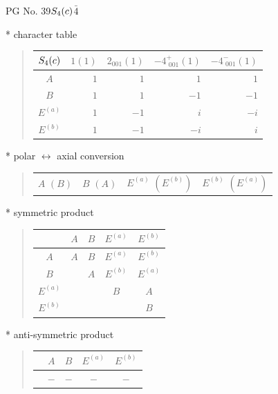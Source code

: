 \documentclass[fleqn,8pt,landscape]{jsarticle}
\begin{document}
\setcounter{MaxMatrixCols}{32}

\renewcommand{\tablename}{Table~}
\renewcommand{\figurename}{Figure~}
\begin{center}
\LARGE
PG No. 39\quad$S_{\rm 4}(c)$\quad$\bar{4}$\quad[ tetragonal ]
\end{center}

* character table
\begin{quote}
\begin{tabular}{crrrr} \hline \hline
$ S_{\rm 4}(c) $ & $ 1(1) $ & $ 2{}_{001}(1) $ & $ -4^{+}_{\,\,001}(1) $ & $ -4^{-}_{\,\,001}(1) $ \\ \hline
$ A $ & $ 1 $ & $ 1 $ & $ 1 $ & $ 1 $ \\
$ B $ & $ 1 $ & $ 1 $ & $ -1 $ & $ -1 $ \\
$ E^{(a)} $ & $ 1 $ & $ -1 $ & $ i $ & $ - i $ \\
$ E^{(b)} $ & $ 1 $ & $ -1 $ & $ - i $ & $ i $ \\
 \hline \hline
\end{tabular}
\end{quote}

* polar $\leftrightarrow$ axial conversion
\begin{quote}
\begin{tabular}{cccc}
$ A\,\,(B) $ & $ B\,\,(A) $ & $ E^{(a)}\,\,(E^{(b)}) $ & $ E^{(b)}\,\,(E^{(a)}) $
\end{tabular}
\end{quote}

* symmetric product
\begin{quote}
\begin{tabular}{c|cccc} \hline \hline
 & $ A $ & $ B $ & $ E^{(a)} $ & $ E^{(b)} $ \\ \hline
$ A $ & $ A $ & $ B $ & $ E^{(a)} $ & $ E^{(b)} $ \\
$ B $ & $  $ & $ A $ & $ E^{(b)} $ & $ E^{(a)} $ \\
$ E^{(a)} $ & $  $ & $  $ & $ B $ & $ A $ \\
$ E^{(b)} $ & $  $ & $  $ & $  $ & $ B $ \\
 \hline \hline
\end{tabular}
\end{quote}

* anti-symmetric product
\begin{quote}
\begin{tabular}{ccccc} \hline \hline
 & $ A $ & $ B $ & $ E^{(a)} $ & $ E^{(b)} $ \\ \hline
$  $ & $ - $ & $ - $ & $ - $ & $ - $ \\
 \hline \hline
\end{tabular}
\end{quote}
\end{document}
